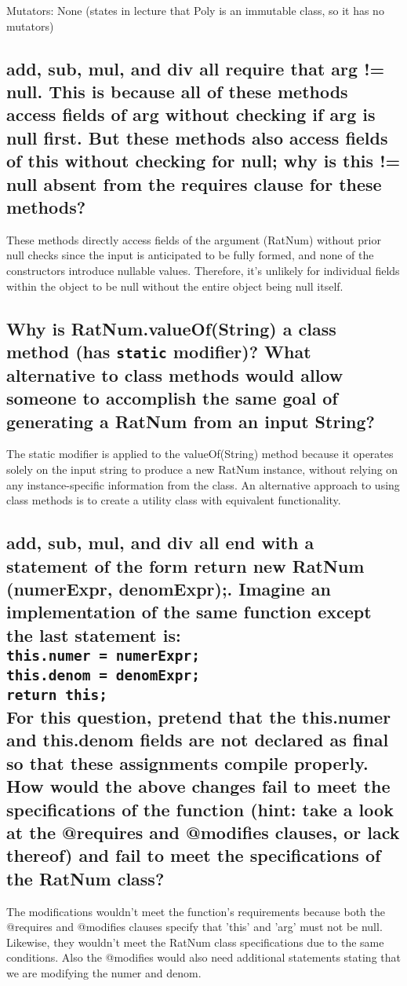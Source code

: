 \documentclass[11pt]{article}
\begin{document}
\noindent Mutators: None (states in lecture that Poly is an immutable class, so it has no mutators)

\subsection{add, sub, mul, and div all require that arg != null. This is because all of these methods
access fields of arg without checking if arg is null first. But these methods also access fields
of this without checking for null; why is this != null absent from the requires clause
for these methods?}
These methods directly access fields of the argument (RatNum) without prior null checks since the input is anticipated to be fully formed, and none of the constructors introduce nullable values. Therefore, it's unlikely for individual fields within the object to be null without the entire object being null itself.
\subsection{Why is RatNum.valueOf(String) a class method (has \texttt{static} modifier)? What alternative
to class methods would allow someone to accomplish the same goal of generating a RatNum
from an input String?}

The static modifier is applied to the valueOf(String) method because it operates solely on the input string to produce a new RatNum instance, without relying on any instance-specific information from the class. An alternative approach to using class methods is to create a utility class with equivalent functionality.

\subsection{add, sub, mul, and div all end with a statement of the form return new RatNum (numerExpr,
denomExpr);. Imagine an implementation of the same function except the last statement is:
\texttt{
\\    this.numer = numerExpr;
\\    this.denom = denomExpr;
\\    return this;
}
\\For this question, pretend that the this.numer and this.denom fields are not declared as
final so that these assignments compile properly. How would the above changes fail to meet
the specifications of the function (hint: take a look at the @requires and @modifies clauses,
or lack thereof) and fail to meet the specifications of the RatNum class?}
The modifications wouldn't meet the function's requirements because both the @requires and @modifies clauses specify that 'this' and 'arg' must not be null. Likewise, they wouldn't meet the RatNum class specifications due to the same conditions.
Also the @modifies would also need additional statements stating that we are modifying the numer and
denom.
\end{document}
